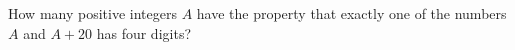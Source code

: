 How many positive integers $A$ have the property that exactly one of the numbers $A$ and $A+20$ has four digits?
